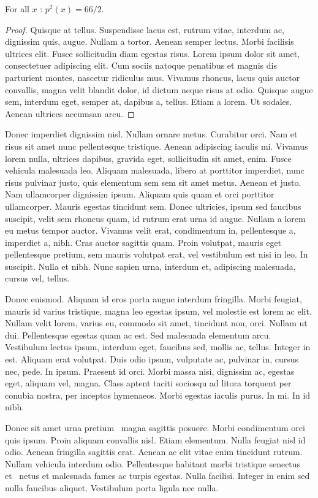 \documentclass[twoside,article,a4paper,12pt,leqno]{memoir}
\begin{document}
\begin{theorem}[dio] For all $x$ : $p^2(x) = 66 / 2$.
\end{theorem}
\begin{proof}
Quisque at tellus. Suspendisse lacus est, rutrum vitae, interdum ac,
dignissim quis, augue. Nullam a tortor. Aenean semper lectus. Morbi
facilisis ultrices elit. Fusce sollicitudin diam egestas risus. Lorem
ipsum dolor sit amet, consectetuer adipiscing elit. Cum sociis natoque
penatibus et magnis dis parturient montes, nascetur ridiculus
mus. Vivamus rhoncus, lacus quis auctor convallis, magna velit blandit
dolor, id dictum neque risus at odio. Quisque augue sem, interdum
eget, semper at, dapibus a, tellus. Etiam a lorem. Ut sodales. Aenean
ultrices accumsan arcu.
\end{proof}

Donec imperdiet dignissim nisl. Nullam ornare metus. Curabitur
orci. Nam et risus sit amet nunc pellentesque tristique. Aenean
adipiscing iaculis mi. Vivamus lorem nulla, ultrices dapibus, gravida
eget, sollicitudin sit amet, enim. Fusce vehicula malesuada
leo. Aliquam malesuada, libero at porttitor imperdiet, nunc risus
pulvinar justo, quis elementum sem sem sit amet metus. Aenean et
justo. Nam ullamcorper dignissim ipsum. Aliquam quis quam et orci
porttitor ullamcorper. Mauris egestas tincidunt sem. Donec ultricies,
ipsum sed faucibus suscipit, velit sem rhoncus quam, id rutrum erat
urna id augue. Nullam a lorem eu metus tempor auctor. Vivamus velit
erat, condimentum in, pellentesque a, imperdiet a, nibh. Cras auctor
sagittis quam. Proin volutpat, mauris eget pellentesque pretium, sem
mauris volutpat erat, vel vestibulum est nisi in leo. In
suscipit. Nulla et nibh. Nunc sapien urna, interdum et, adipiscing
malesuada, cursus vel, tellus.

Donec euismod. Aliquam id eros porta augue interdum fringilla. Morbi
feugiat, mauris id varius tristique, magna leo egestas ipsum, vel
molestie est lorem ac elit. Nullam velit lorem, varius eu, commodo sit
amet, tincidunt non, orci. Nullam ut dui. Pellentesque egestas quam ac
est. Sed malesuada elementum arcu. Vestibulum lectus ipsum, interdum
eget, faucibus sed, mollis ac, tellus. Integer in est. Aliquam erat
volutpat. Duis odio ipsum, vulputate ac, pulvinar in, cursus nec,
pede. In ipsum. Praesent id orci. Morbi massa nisi, dignissim ac,
egestas eget, aliquam vel, magna. Class aptent taciti sociosqu ad
litora torquent per conubia nostra, per inceptos hymenaeos. Morbi
egestas iaculis purus. In mi. In id nibh.

Donec sit amet urna pretium~\cite{thearticle} magna sagittis
posuere. Morbi condimentum orci quis ipsum. Proin aliquam convallis
nisl. Etiam elementum. Nulla feugiat nisl id odio. Aenean fringilla
sagittis erat. Aenean ac elit vitae enim tincidunt rutrum. Nullam
vehicula interdum odio. Pellentesque habitant morbi tristique senectus
et~\cite{articlebis} netus et malesuada fames ac turpis egestas. Nulla
facilisi. Integer in enim sed nulla faucibus aliquet. Vestibulum porta
ligula nec nulla.


\end{document}
